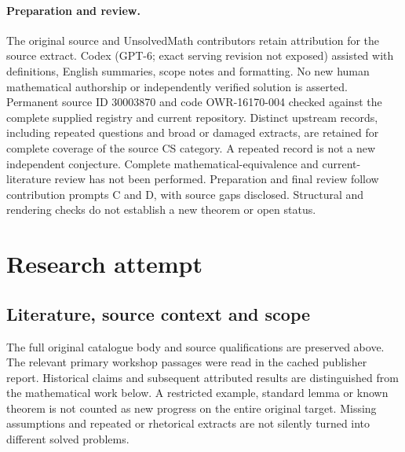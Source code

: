 \documentclass[11pt]{article}
\begin{document}
\paragraph{Preparation and review.}
The original source and UnsolvedMath contributors retain attribution for the source extract. Codex (GPT-6; exact serving revision not exposed) assisted with definitions, English summaries, scope notes and formatting. No new human mathematical authorship or independently verified solution is asserted. Permanent source ID 30003870 and code OWR-16170-004 checked against the complete supplied registry and current repository. Distinct upstream records, including repeated questions and broad or damaged extracts, are retained for complete coverage of the source CS category. A repeated record is not a new independent conjecture. Complete mathematical-equivalence and current-literature review has not been performed. Preparation and final review follow contribution prompts C and D, with source gaps disclosed. Structural and rendering checks do not establish a new theorem or open status.
\label{end:30003870}

\section{Research attempt}
\subsection{Literature, source context and scope}
The full original catalogue body and source qualifications are preserved above. The relevant primary workshop passages were read in the cached publisher report. Historical claims and subsequent attributed results are distinguished from the mathematical work below. A restricted example, standard lemma or known theorem is not counted as new progress on the entire original target. Missing assumptions and repeated or rhetorical extracts are not silently turned into different solved problems.
\end{document}
